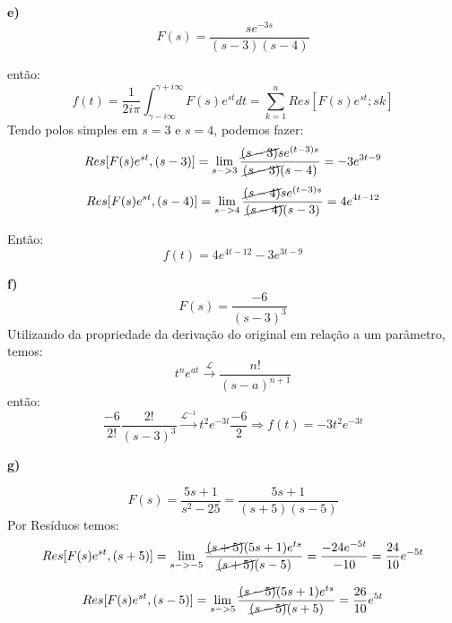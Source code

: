 \textbf{e)}
\begin{equation*}
    F(s) = \frac{se^{-3s}}{(s-3)(s-4)}
\end{equation*}

então:
\begin{equation*}
    f(t) = \frac{1}{2i\pi}\int_{\gamma - i\infty}^{\gamma + i\infty} F(s)e^{st}dt = \sum_{k=1}^nRes[F(s)e^{st}; sk]
\end{equation*}
Tendo polos simples em $s=3$ e $s=4$, podemos fazer:
\begin{equation*}
    Res[F(s)e^{st}, (s-3)] = \lim_{s->3} \frac{\cancel{(s-3)}se^{(t-3)s}}{\cancel{(s-3)}(s-4)} = -3e^{3t-9}
\end{equation*}
\begin{equation*}
    Res[F(s)e^{st}, (s-4)] = \lim_{s->4} \frac{\cancel{(s-4)}se^{(t-3)s}}{\cancel{(s-4)}(s-3)} = 4e^{4t-12}
\end{equation*}

Então:
\begin{equation*}
    \boxed{f(t) = 4e^{4t-12}-3e^{3t-9}}
\end{equation*}

\textbf{f)}
\begin{equation*}
    F(s) = \frac{-6}{(s-3)^3}
\end{equation*}
Utilizando da propriedade da derivação do original em relação a um parâmetro, temos:
\begin{equation*}
    t^ne^{at} \xrightarrow{\mathcal{L}} \frac{n!}{(s-a)^{n+1}}
\end{equation*}
então:
\begin{equation*}
    \frac{-6}{2!}\frac{2!}{(s-3)^3}\xrightarrow{\mathcal{L}^{-1}}t^2e^{-3t}\frac{-6}{2} \Rightarrow \boxed{f(t) = -3t^2e^{-3t}}
\end{equation*}

\textbf{g)}

\begin{equation*}
    F(s) = \frac{5s+1}{s^2-25} = \frac{5s+1}{(s+5)(s-5)}
\end{equation*}
Por Resíduos temos:
\begin{equation*}
    Res[F(s)e^{st}, (s+5)] = \lim_{s->-5} \frac{\cancel{(s+5)}(5s+1)e^{ts}}{\cancel{(s+5)}(s-5)} = \frac{-24e^{-5t}}{-10} = \frac{24}{10}e^{-5t}
\end{equation*}

\begin{equation*}
    Res[F(s)e^{st}, (s-5)] = \lim_{s->5} \frac{\cancel{(s-5)}(5s+1)e^{ts}}{\cancel{(s-5)}(s+5)} = \frac{26}{10}e^{5t}
\end{equation*}

